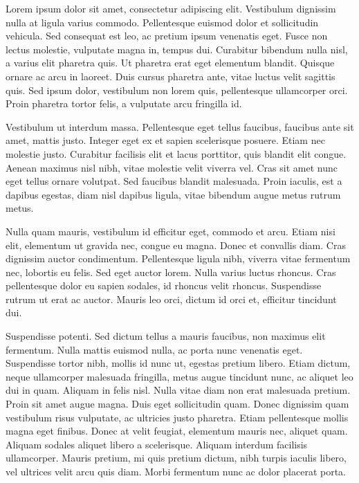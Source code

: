 \documentclass{article}
\begin{document}
\date{}



\beginnumbering
\autopar


Lorem ipsum dolor sit amet, consectetur adipiscing elit. Vestibulum dignissim nulla at ligula varius commodo. Pellentesque euismod dolor et sollicitudin vehicula. Sed consequat est leo, ac pretium ipsum venenatis eget. Fusce non lectus molestie, vulputate magna in, tempus dui. Curabitur bibendum nulla nisl, a varius elit pharetra quis. Ut pharetra erat eget elementum blandit. Quisque ornare ac arcu in laoreet. Duis cursus pharetra ante, vitae luctus velit sagittis quis. Sed ipsum dolor, vestibulum non lorem quis, pellentesque ullamcorper orci. Proin pharetra tortor felis, a vulputate arcu fringilla id.

Vestibulum ut interdum massa. Pellentesque eget tellus faucibus, faucibus ante sit amet, mattis justo. Integer eget ex et sapien scelerisque posuere. Etiam nec molestie justo. Curabitur facilisis elit et lacus porttitor, quis blandit elit congue. Aenean maximus nisl nibh, vitae molestie velit viverra vel. Cras sit amet nunc eget tellus ornare volutpat. Sed faucibus blandit malesuada. Proin iaculis, est a dapibus egestas, diam nisl dapibus ligula, vitae bibendum augue metus rutrum metus.

Nulla quam mauris, vestibulum id efficitur eget, commodo et arcu. Etiam nisi elit, elementum ut gravida nec, congue eu magna. Donec et convallis diam. Cras dignissim auctor condimentum. Pellentesque ligula nibh, viverra vitae fermentum nec, lobortis eu felis. Sed eget auctor lorem. Nulla varius luctus rhoncus. Cras pellentesque dolor eu sapien sodales, id rhoncus velit rhoncus. Suspendisse rutrum ut erat ac auctor. Mauris leo orci, dictum id orci et, efficitur tincidunt dui.

Suspendisse potenti. Sed dictum tellus a mauris faucibus, non maximus elit fermentum. Nulla mattis euismod nulla, ac porta nunc venenatis eget. Suspendisse tortor nibh, mollis id nunc ut, egestas pretium libero. Etiam dictum, neque ullamcorper malesuada fringilla, metus augue tincidunt nunc, ac aliquet leo dui in quam. Aliquam in felis nisl. Nulla vitae diam non erat malesuada pretium. Proin sit amet augue magna. Duis eget sollicitudin quam. Donec dignissim quam vestibulum risus vulputate, ac ultricies justo pharetra. Etiam pellentesque mollis magna eget finibus. Donec at velit feugiat, elementum mauris nec, aliquet quam. Aliquam sodales aliquet libero a scelerisque. Aliquam interdum facilisis ullamcorper. Mauris pretium, mi quis pretium dictum, nibh turpis iaculis libero, vel ultrices velit arcu quis diam. Morbi fermentum nunc ac dolor placerat porta.
\end{document}
